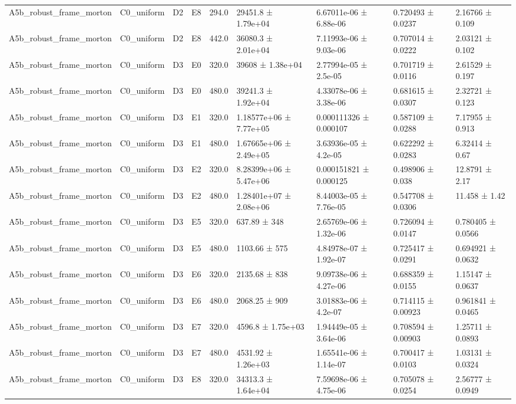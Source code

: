 \begin{table}
\begin{tabular}{lllllllll}
A5b\_robust\_frame\_morton & C0\_uniform & D2 & E8 & 294.0 & 29451.8 ± 1.79e+04 & 6.67011e-06 ± 6.88e-06 & 0.720493 ± 0.0237 & 2.16766 ± 0.109 \\
A5b\_robust\_frame\_morton & C0\_uniform & D2 & E8 & 442.0 & 36080.3 ± 2.01e+04 & 7.11993e-06 ± 9.03e-06 & 0.707014 ± 0.0222 & 2.03121 ± 0.102 \\
A5b\_robust\_frame\_morton & C0\_uniform & D3 & E0 & 320.0 & 39608 ± 1.38e+04 & 2.77994e-05 ± 2.5e-05 & 0.701719 ± 0.0116 & 2.61529 ± 0.197 \\
A5b\_robust\_frame\_morton & C0\_uniform & D3 & E0 & 480.0 & 39241.3 ± 1.92e+04 & 4.33078e-06 ± 3.38e-06 & 0.681615 ± 0.0307 & 2.32721 ± 0.123 \\
A5b\_robust\_frame\_morton & C0\_uniform & D3 & E1 & 320.0 & 1.18577e+06 ± 7.77e+05 & 0.000111326 ± 0.000107 & 0.587109 ± 0.0288 & 7.17955 ± 0.913 \\
A5b\_robust\_frame\_morton & C0\_uniform & D3 & E1 & 480.0 & 1.67665e+06 ± 2.49e+05 & 3.63936e-05 ± 4.2e-05 & 0.622292 ± 0.0283 & 6.32414 ± 0.67 \\
A5b\_robust\_frame\_morton & C0\_uniform & D3 & E2 & 320.0 & 8.28399e+06 ± 5.47e+06 & 0.000151821 ± 0.000125 & 0.498906 ± 0.038 & 12.8791 ± 2.17 \\
A5b\_robust\_frame\_morton & C0\_uniform & D3 & E2 & 480.0 & 1.28401e+07 ± 2.08e+06 & 8.44003e-05 ± 7.76e-05 & 0.547708 ± 0.0306 & 11.458 ± 1.42 \\
A5b\_robust\_frame\_morton & C0\_uniform & D3 & E5 & 320.0 & 637.89 ± 348 & 2.65769e-06 ± 1.32e-06 & 0.726094 ± 0.0147 & 0.780405 ± 0.0566 \\
A5b\_robust\_frame\_morton & C0\_uniform & D3 & E5 & 480.0 & 1103.66 ± 575 & 4.84978e-07 ± 1.92e-07 & 0.725417 ± 0.0291 & 0.694921 ± 0.0632 \\
A5b\_robust\_frame\_morton & C0\_uniform & D3 & E6 & 320.0 & 2135.68 ± 838 & 9.09738e-06 ± 4.27e-06 & 0.688359 ± 0.0155 & 1.15147 ± 0.0637 \\
A5b\_robust\_frame\_morton & C0\_uniform & D3 & E6 & 480.0 & 2068.25 ± 909 & 3.01883e-06 ± 4.2e-07 & 0.714115 ± 0.00923 & 0.961841 ± 0.0465 \\
A5b\_robust\_frame\_morton & C0\_uniform & D3 & E7 & 320.0 & 4596.8 ± 1.75e+03 & 1.94449e-05 ± 3.64e-06 & 0.708594 ± 0.00903 & 1.25711 ± 0.0893 \\
A5b\_robust\_frame\_morton & C0\_uniform & D3 & E7 & 480.0 & 4531.92 ± 1.26e+03 & 1.65541e-06 ± 1.14e-07 & 0.700417 ± 0.0103 & 1.03131 ± 0.0324 \\
A5b\_robust\_frame\_morton & C0\_uniform & D3 & E8 & 320.0 & 34313.3 ± 1.64e+04 & 7.59698e-06 ± 4.75e-06 & 0.705078 ± 0.0254 & 2.56777 ± 0.0949 \\

\end{tabular}
\end{table}
